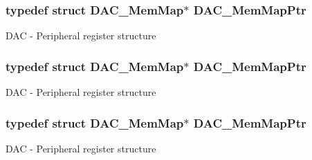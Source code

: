 \subsubsection[{\texorpdfstring{D\+A\+C\+\_\+\+Mem\+Map\+Ptr}{DAC_MemMapPtr}}]{\setlength{\rightskip}{0pt plus 5cm}typedef struct {\bf D\+A\+C\+\_\+\+Mem\+Map}$\ast$ {\bf D\+A\+C\+\_\+\+Mem\+Map\+Ptr}}\hypertarget{group___d_a_c___peripheral_gaf4fffbe25ce148c577ec740897223a7f}{}\label{group___d_a_c___peripheral_gaf4fffbe25ce148c577ec740897223a7f}
D\+AC -\/ Peripheral register structure 
\subsubsection[{\texorpdfstring{D\+A\+C\+\_\+\+Mem\+Map\+Ptr}{DAC_MemMapPtr}}]{\setlength{\rightskip}{0pt plus 5cm}typedef struct {\bf D\+A\+C\+\_\+\+Mem\+Map}$\ast$ {\bf D\+A\+C\+\_\+\+Mem\+Map\+Ptr}}\hypertarget{group___d_a_c___peripheral_gaf4fffbe25ce148c577ec740897223a7f}{}\label{group___d_a_c___peripheral_gaf4fffbe25ce148c577ec740897223a7f}
D\+AC -\/ Peripheral register structure 
\subsubsection[{\texorpdfstring{D\+A\+C\+\_\+\+Mem\+Map\+Ptr}{DAC_MemMapPtr}}]{\setlength{\rightskip}{0pt plus 5cm}typedef struct {\bf D\+A\+C\+\_\+\+Mem\+Map}$\ast$ {\bf D\+A\+C\+\_\+\+Mem\+Map\+Ptr}}\hypertarget{group___d_a_c___peripheral_gaf4fffbe25ce148c577ec740897223a7f}{}\label{group___d_a_c___peripheral_gaf4fffbe25ce148c577ec740897223a7f}
D\+AC -\/ Peripheral register structure 